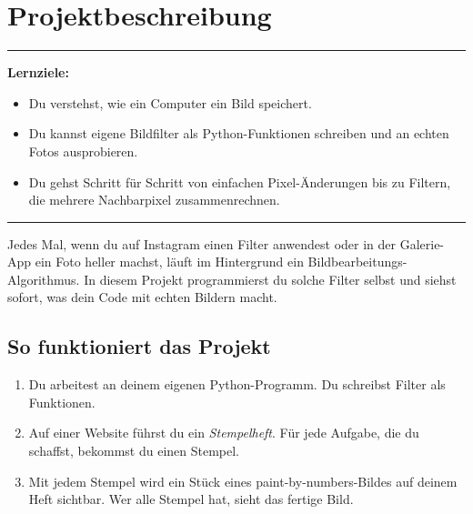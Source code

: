 \renewcommand{\chaptertag}{Bildfilter}
\chapter{Projektbeschreibung}

\vspace{-5pt}
{\color{maincolor}\rule{\textwidth}{0.4pt}}
\vspace{4pt}

{\color{maincolor}\textbf{Lernziele:}}
\begin{itemize}[leftmargin=*]
  \item Du verstehst, wie ein Computer ein Bild speichert.
  \item Du kannst eigene Bildfilter als Python-Funktionen schreiben und an
    echten Fotos ausprobieren.
  \item Du gehst Schritt f\"ur Schritt von einfachen Pixel-\"Anderungen
    bis zu Filtern, die mehrere Nachbarpixel zusammenrechnen.
\end{itemize}
\vspace{-2pt}
{\color{maincolor}\rule{\textwidth}{0.4pt}}
\vspace{8pt}

Jedes Mal, wenn du auf Instagram einen Filter anwendest oder in der
Galerie-App ein Foto heller machst, l\"auft im Hintergrund ein
Bildbearbeitungs-Algorithmus. In diesem Projekt programmierst du solche
Filter selbst und siehst sofort, was dein Code mit echten Bildern macht.

\section{So funktioniert das Projekt}

\begin{enumerate}
  \item Du arbeitest an deinem eigenen Python-Programm. Du schreibst Filter
    als Funktionen.
  \item Auf einer Website f\"uhrst du ein \textit{Stempelheft}. F\"ur jede
    Aufgabe, die du schaffst, bekommst du einen Stempel.
  \item Mit jedem Stempel wird ein St\"uck eines paint-by-numbers-Bildes auf
    deinem Heft sichtbar. Wer alle Stempel hat, sieht das fertige Bild.
\end{enumerate}

